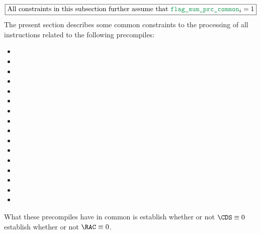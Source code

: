 \[
	\boxed{\text{All constraints in this subsection further assume that }
	\locPrcFlagSumCommon_{i} = 1
	}
\]
The present section describes some common constraints to the processing of all \oobMod{} instructions related to the following precompiles:
\begin{multicols}{2}
	\begin{itemize}
		\item \instEcrecover{}
		\item \instShaTwo{}
		\item \instRipemd{}
		\item \instIdentity{}
		\item \instEcadd{}
		\item \instEcmul{}
		\item \instEcpairing{}
		\item[\vspace{\fill}]
		\item \instPointEvaluation{}
		\item \instBlsGOneAdd{}
		\item \instBlsGOneMsm{}
		\item \instBlsGTwoAdd{}
		\item \instBlsGTwoMsm{}
		\item \instBlsPairingCheck{}
		\item \instBlsMapFpToGOne{}
		\item \instBlsMapFpTwoToGTwo{}
	\end{itemize}
\end{multicols}
\noindent What these precompiles have in common is
 establish whether or not $\CDS \equiv 0$
 establish whether or not $\RAC \equiv 0$.

